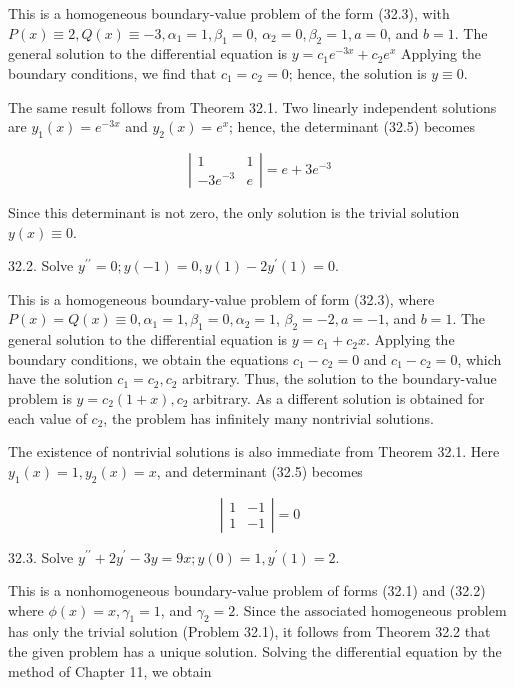 \documentclass[10pt]{article}
\begin{document}
This is a homogeneous boundary-value problem of the form (32.3), with $P(x) \equiv 2, Q(x) \equiv-3, \alpha_{1}=1, \beta_{1}=0$, $\alpha_{2}=0, \beta_{2}=1, a=0$, and $b=1$. The general solution to the differential equation is $y=c_{1} e^{-3 x}+c_{2} e^{x}$ Applying the boundary conditions, we find that $c_{1}=c_{2}=0$; hence, the solution is $y \equiv 0$.

The same result follows from Theorem 32.1. Two linearly independent solutions are $y_{1}(x)=e^{-3 x}$ and $y_{2}(x)=e^{x}$; hence, the determinant (32.5) becomes

$$
\left|\begin{array}{cc}
1 & 1 \\
-3 e^{-3} & e
\end{array}\right|=e+3 e^{-3}
$$

Since this determinant is not zero, the only solution is the trivial solution $y(x) \equiv 0$.

32.2. Solve $y^{\prime \prime}=0 ; y(-1)=0, y(1)-2 y^{\prime}(1)=0$.

This is a homogeneous boundary-value problem of form (32.3), where $P(x)=Q(x) \equiv 0, \alpha_{1}=1, \beta_{1}=0, \alpha_{2}=1$, $\beta_{2}=-2, a=-1$, and $b=1$. The general solution to the differential equation is $y=c_{1}+c_{2} x$. Applying the boundary conditions, we obtain the equations $c_{1}-c_{2}=0$ and $c_{1}-c_{2}=0$, which have the solution $c_{1}=c_{2}, c_{2}$ arbitrary. Thus, the solution to the boundary-value problem is $y=c_{2}(1+x), c_{2}$ arbitrary. As a different solution is obtained for each value of $c_{2}$, the problem has infinitely many nontrivial solutions.

The existence of nontrivial solutions is also immediate from Theorem 32.1. Here $y_{1}(x)=1, y_{2}(x)=x$, and determinant (32.5) becomes

$$
\left|\begin{array}{ll}
1 & -1 \\
1 & -1
\end{array}\right|=0
$$

32.3. Solve $y^{\prime \prime}+2 y^{\prime}-3 y=9 x ; y(0)=1, y^{\prime}(1)=2$.

This is a nonhomogeneous boundary-value problem of forms (32.1) and (32.2) where $\phi(x)=x, \gamma_{1}=1$, and $\gamma_{2}=2$. Since the associated homogeneous problem has only the trivial solution (Problem 32.1), it follows from Theorem 32.2 that the given problem has a unique solution. Solving the differential equation by the method of Chapter 11, we obtain
\end{document}
